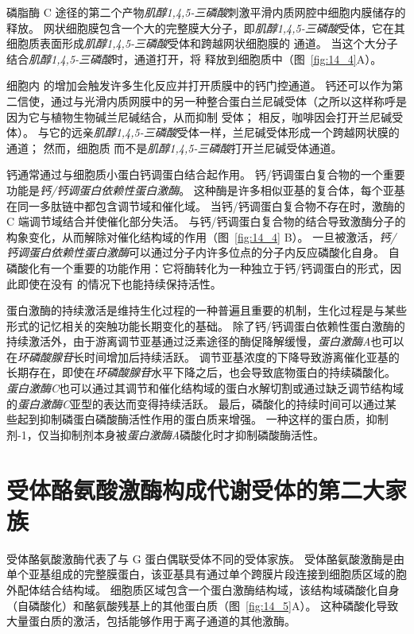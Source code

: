 磷脂酶 C 途径的第二个产物\textit{肌醇1,4,5-三磷酸}刺激平滑内质网腔中细胞内膜储存的  释放。
网状细胞膜包含一个大的完整膜大分子，即\textit{肌醇1,4,5-三磷酸}受体，它在其细胞质表面形成\textit{肌醇1,4,5-三磷酸}受体和跨越网状细胞膜的  通道。
当这个大分子结合\textit{肌醇1,4,5-三磷酸}时，通道打开，将  释放到细胞质中（图~\ref{fig:14_4}A）。


细胞内  的增加会触发许多生化反应并打开质膜中的钙门控通道。
钙还可以作为第二信使，通过与光滑内质网膜中的另一种整合蛋白兰尼碱受体（之所以这样称呼是因为它与植物生物碱兰尼碱结合，从而抑制 受体；
相反，咖啡因会打开兰尼碱受体）。
与它的远亲\textit{肌醇1,4,5-三磷酸}受体一样，兰尼碱受体形成一个跨越网状膜的  通道；
然而，细胞质  而不是\textit{肌醇1,4,5-三磷酸}打开兰尼碱受体通道。


钙通常通过与细胞质小蛋白钙调蛋白结合起作用。
钙/钙调蛋白复合物的一个重要功能是\textit{钙/钙调蛋白依赖性蛋白激酶}。
这种酶是许多相似亚基的复合体，每个亚基在同一多肽链中都包含调节域和催化域。
当钙/钙调蛋白复合物不存在时，激酶的 C 端调节域结合并使催化部分失活。
与钙/钙调蛋白复合物的结合导致激酶分子的构象变化，从而解除对催化结构域的作用（图~\ref{fig:14_4} B）。
一旦被激活，\textit{钙/钙调蛋白依赖性蛋白激酶}可以通过分子内许多位点的分子内反应磷酸化自身。
自磷酸化有一个重要的功能作用：它将酶转化为一种独立于钙/钙调蛋白的形式，因此即使在没有  的情况下也能持续保持活性。


蛋白激酶的持续激活是维持生化过程的一种普遍且重要的机制，生化过程是与某些形式的记忆相关的突触功能长期变化的基础。
除了钙/钙调蛋白依赖性蛋白激酶的持续激活外，由于游离调节亚基通过泛素途径的酶促降解缓慢，\textit{蛋白激酶A}也可以在\textit{环磷酸腺苷}长时间增加后持续活跃。
调节亚基浓度的下降导致游离催化亚基的长期存在，即使在\textit{环磷酸腺苷}水平下降之后，也会导致底物蛋白的持续磷酸化。
\textit{蛋白激酶C}也可以通过其调节和催化结构域的蛋白水解切割或通过缺乏调节结构域的\textit{蛋白激酶C}亚型的表达而变得持续活跃。
最后，磷酸化的持续时间可以通过某些起到抑制磷蛋白磷酸酶活性作用的蛋白质来增强。
一种这样的蛋白质，抑制剂-1，仅当抑制剂本身被\textit{蛋白激酶A}磷酸化时才抑制磷酸酶活性。



\section{受体酪氨酸激酶构成代谢受体的第二大家族}

受体酪氨酸激酶代表了与 G 蛋白偶联受体不同的受体家族。
受体酪氨酸激酶是由单个亚基组成的完整膜蛋白，该亚基具有通过单个跨膜片段连接到细胞质区域的胞外配体结合结构域。
细胞质区域包含一个蛋白激酶结构域，该结构域磷酸化自身（自磷酸化）和酪氨酸残基上的其他蛋白质（图~\ref{fig:14_5}A）。
这种磷酸化导致大量蛋白质的激活，包括能够作用于离子通道的其他激酶。



